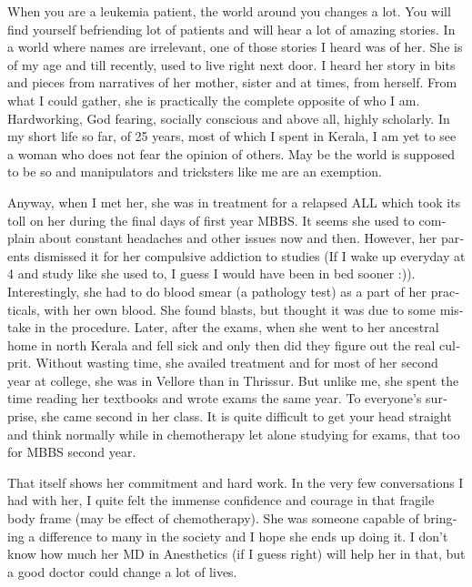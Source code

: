 \vskip 2pt
\begin{english}
When you are a leukemia patient, the world around you changes a lot. You will find yourself befriending lot of patients and will hear a lot of amazing stories. In a world where names are irrelevant, one of those stories I heard was of her. She is of my age and till recently, used to live right next door. I heard her story in bits and pieces from narratives of her mother, sister and at times, from herself. From what I could gather, she is practically the complete opposite of who I am. Hardworking, God fearing, socially conscious and above all, highly scholarly. In my short life so far, of 25 years, most of which I spent in Kerala, I am yet to see a woman who does not fear the opinion of others. May be the world is supposed to be so and manipulators and tricksters like me are an exemption.

Anyway, when I met her, she was in treatment for a relapsed ALL which took its toll on her during the final days of first year MBBS. It seems she used to complain about constant headaches and other issues now and then. However, her parents dismissed it for her compulsive addiction to studies (If I wake up everyday at 4 and study like she used to, I guess I would have been in bed sooner :)). Interestingly, she had to do blood smear (a pathology test) as a part of her practicals, with her own blood. She found blasts, but thought it was due to some mistake in the procedure. Later, after the exams, when she went to her ancestral home in north Kerala and fell sick and only then did they figure out the real culprit. Without wasting time, she availed treatment and for most of her second year at college, she was in Vellore than in Thrissur. But unlike me, she spent the time reading her textbooks and wrote exams the same year. To everyone's surprise, she came second in her class. It is quite difficult to get your head straight and think normally while in chemotherapy let alone studying for exams, that too for MBBS second year. 

That itself shows her commitment and hard work. In the very few conversations I had with her, I quite felt the immense confidence and courage in that fragile body frame (may be effect of chemotherapy). She was someone capable of bringing a difference to many in the society and I hope she ends up doing it. I don't know how much her MD in Anesthetics (if I guess right) will help her in that, but a good doctor could change a lot of lives. 


\end{english}

